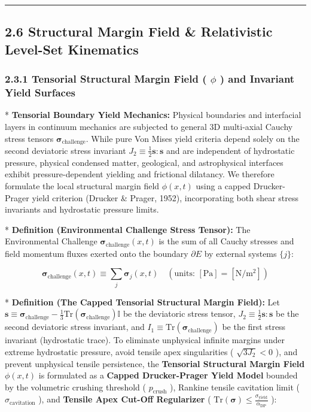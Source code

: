 \documentclass[11pt,a4paper]{article}
\theoremstyle{definition}\newtheorem{definition}{Definition}
\theoremstyle{remark}\newtheorem{remark}{Remark}
\begin{document}
\noindent\rule{\linewidth}{0.4pt}
\subsection{2.6 Structural Margin Field \& Relativistic Level-Set Kinematics}
\subsubsection{2.3.1 Tensorial Structural Margin Field ( $\phi$ ) and Invariant Yield Surfaces}

* \textbf{Tensorial Boundary Yield Mechanics:} Physical boundaries and interfacial layers in continuum mechanics are subjected to general 3D multi-axial Cauchy stress tensors $\boldsymbol{\sigma}_{\text{challenge}}$. While pure Von Mises yield criteria depend solely on the second deviatoric stress invariant $J_2 \equiv \frac{1}{2}\mathbf{s}:\mathbf{s}$ and are independent of hydrostatic pressure, physical condensed matter, geological, and astrophysical interfaces exhibit pressure-dependent yielding and frictional dilatancy. We therefore formulate the local structural margin field $\phi(x, t)$ using a capped Drucker-Prager yield criterion (Drucker \& Prager, 1952), incorporating both shear stress invariants and hydrostatic pressure limits.

* \textbf{Definition (Environmental Challenge Stress Tensor):}
The Environmental Challenge $\boldsymbol{\sigma}_{\text{challenge}}(x, t)$ is the sum of all Cauchy stresses and field momentum fluxes exerted onto the boundary $\partial E$ by external systems $\{j\}$:


\begin{equation}
\boldsymbol{\sigma}_{\text{challenge}}(x, t) \equiv \sum_{j} \boldsymbol{\sigma}_j(x, t) \quad \left( \text{units: } [\mathrm{Pa}] = [\mathrm{N/m^2}] \right)
\end{equation}


* \textbf{Definition (The Capped Tensorial Structural Margin Field):}
Let $\mathbf{s} \equiv \boldsymbol{\sigma}_{\text{challenge}} - \frac{1}{3}\mathrm{Tr}(\boldsymbol{\sigma}_{\text{challenge}})\mathbb{I}$ be the deviatoric stress tensor, $J_2 \equiv \frac{1}{2} \mathbf{s} : \mathbf{s}$ be the second deviatoric stress invariant, and $I_1 \equiv \mathrm{Tr}(\boldsymbol{\sigma}_{\text{challenge}})$ be the first stress invariant (hydrostatic trace).
To eliminate unphysical infinite margins under extreme hydrostatic pressure, avoid tensile apex singularities ( $\sqrt{3 J_2} < 0$ ), and prevent unphysical tensile persistence, the \textbf{Tensorial Structural Margin Field $\phi(x, t)$} is formulated as a \textbf{Capped Drucker-Prager Yield Model} bounded by the volumetric crushing threshold ( $p_{\text{crush}}$ ), Rankine tensile cavitation limit ( $\sigma_{\text{cavitation}}$ ), and \textbf{Tensile Apex Cut-Off Regularizer} ( $\mathrm{Tr}(\boldsymbol{\sigma}) \le \frac{\sigma_{\text{yield}}}{\alpha_{\text{DP}}}$ ):
\end{document}
